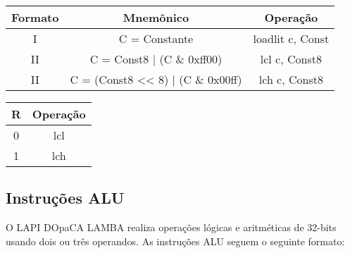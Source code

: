\documentclass{article}
\begin{document}
    \begin{table}[H]
      \begin{center}
        \begin{tabular}{|c|c|c|} 
          \hline
          \cellcolor[gray]{0.9}\textbf{Formato} & \cellcolor[gray]{0.9}\textbf{Mnemônico} & \cellcolor[gray]{0.9}\textbf{Operação} \\ \hline
			I & C = Constante & loadlit c, Const \\ \hline
            II & C = Const8 | (C \& 0xff00) &	lcl c, Const8 \\ \hline
            II & C = (Const8 << 8) | (C \& 0x00ff) &	lch c, Const8 \\ \hline
 		\end{tabular}
      \end{center}
    \end{table}
    \begin{table}[H]
      \begin{center}
        \begin{tabular}[pos]{|c|c|} 
        \hline
			\cellcolor[gray]{0.9}\textbf{R} & \cellcolor[gray] {0.9}\textbf{Operação} \\ \hline    		
            0 & lcl \\ \hline
			1 & lch \\ \hline
    	\end{tabular}
      \end{center}
    \end{table}
    
  \subsection{Instruções ALU}
  
  O LAPI DOpaCA LAMBA realiza operações lógicas e aritméticas de 32-bits usando dois ou três operandos. As instruções ALU seguem o seguinte formato:
  
\end{document}
